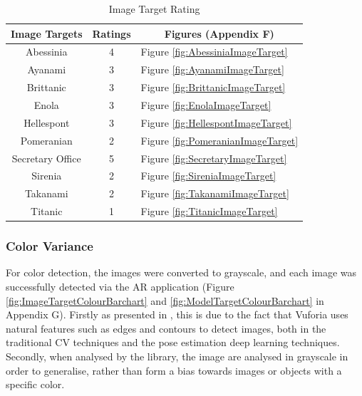\documentclass{aifyp}
\begin{document}
\begin{table}[h]
\begin{center}
\begin{tabular}{|c|c|l|}
\hline
\textbf{Image Targets} & \textbf{Ratings} & \multicolumn{1}{c|}{\textbf{Figures} (Appendix F)} \\ \hline
Abessinia & 4 & Figure \ref{fig:AbessiniaImageTarget} \\ \hline
Ayanami & 3 & Figure \ref{fig:AyanamiImageTarget} \\ \hline
Brittanic & 3 & Figure \ref{fig:BrittanicImageTarget} \\ \hline
Enola & 3 & Figure \ref{fig:EnolaImageTarget} \\ \hline
Hellespont & 3 & Figure \ref{fig:HellespontImageTarget} \\ \hline
Pomeranian & 2 & Figure \ref{fig:PomeranianImageTarget} \\ \hline
Secretary Office & 5 & Figure \ref{fig:SecretaryImageTarget} \\ \hline
Sirenia & 2 & Figure \ref{fig:SireniaImageTarget} \\ \hline
Takanami & 2 & Figure \ref{fig:TakanamiImageTarget} \\ \hline
Titanic & 1 & Figure \ref{fig:TitanicImageTarget} \\ \hline
\end{tabular}
\caption{Image Target Rating}
\label{tab:ImageTargetRatings}
\end{center}
\end{table}
\subsubsection{Color Variance}
For color detection, the images were converted to grayscale, and each image was successfully detected via the AR application (Figure \ref{fig:ImageTargetColourBarchart} and \ref{fig:ModelTargetColourBarchart} in Appendix G). Firstly as presented in \cite{VuforiaUnity}, this is due to the fact that Vuforia uses natural features such as edges and contours to detect images, both in the traditional CV techniques and the pose estimation deep learning techniques. Secondly, when analysed by the library, the image are analysed in grayscale in order to generalise, rather than form a bias towards images or objects with a specific color.
\end{document}

